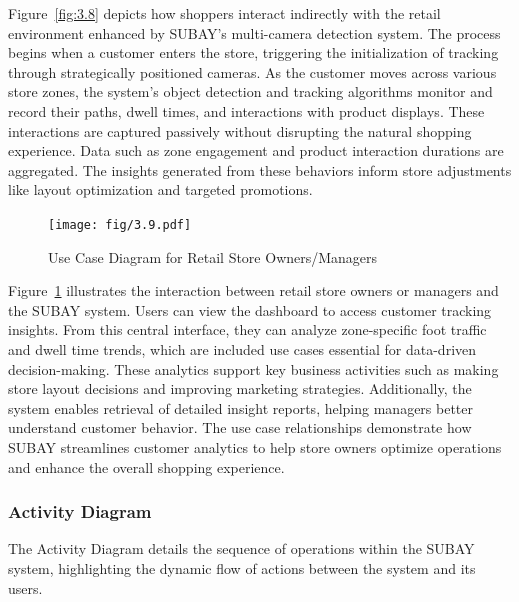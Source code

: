 {Figure~\ref{fig:3.8} depicts how shoppers interact indirectly with the retail environment enhanced by SUBAY’s multi-camera detection system. The process begins when a customer enters the store, triggering the initialization of tracking through strategically positioned cameras. As the customer moves across various store zones, the system’s object detection and tracking algorithms monitor and record their paths, dwell times, and interactions with product displays. These interactions are captured passively without disrupting the natural shopping experience. Data such as zone engagement and product interaction durations are aggregated. The insights generated from these behaviors inform store adjustments like layout optimization and targeted promotions.

\begin{figure}[H]
	\caption[Use Case Diagram for Retail Store Owners/Managers]{\newline \newline Use Case Diagram for Retail Store Owners/Managers}
	\centering
	\texttt{[image: fig/3.9.pdf]}
	\label{fig:3.9}
\end{figure}

Figure~\ref{fig:3.9} illustrates the interaction between retail store owners or managers and the SUBAY system. Users can view the dashboard to access customer tracking insights. From this central interface, they can analyze zone-specific foot traffic and dwell time trends, which are included use cases essential for data-driven decision-making. These analytics support key business activities such as making store layout decisions and improving marketing strategies. Additionally, the system enables retrieval of detailed insight reports, helping managers better understand customer behavior. The use case relationships demonstrate how SUBAY streamlines customer analytics to help store owners optimize operations and enhance the overall shopping experience.

\subsubsection{Activity Diagram}

The Activity Diagram details the sequence of operations within the SUBAY system, highlighting the dynamic flow of actions between the system and its users.

}
